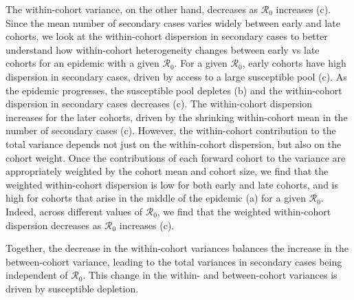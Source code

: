 The within-cohort variance, on the other hand, decreases as $\mathcal{R}_0$ increases (c). Since the mean number of secondary cases varies widely between early and late cohorts, we look at the within-cohort dispersion in secondary cases to better understand how within-cohort heterogeneity changes between early vs late cohorts for an epidemic with a given $\mathcal{R}_0$. For a given $\mathcal{R}_0$, early cohorts have high dispersion in secondary cases, driven by access to a large susceptible pool (c). As the epidemic progresses, the susceptible pool depletes (b) and the within-cohort dispersion in secondary cases decreases (c). The within-cohort dispersion increases for the later cohorts, driven by the shrinking within-cohort mean in the number of secondary cases (c). However, the within-cohort contribution to the total variance depends not just on the within-cohort dispersion, but also on the cohort weight. Once the contributions of each forward cohort to the variance are appropriately weighted by the cohort mean and cohort size, we find that the weighted within-cohort dispersion is low for both early and late cohorts, and is high for cohorts that arise in the middle of the epidemic (a) for a given $\mathcal{R}_0$. Indeed, across different values of $\mathcal{R}_0$, we find that the weighted within-cohort dispersion decreases as $\mathcal{R}_0$ increases (c).

Together, the decrease in the within-cohort variances balances the increase in the between-cohort variance, leading to the total variances in secondary cases being independent of $\mathcal{R}_0$. This change in the within- and between-cohort variances is driven by susceptible depletion. 





